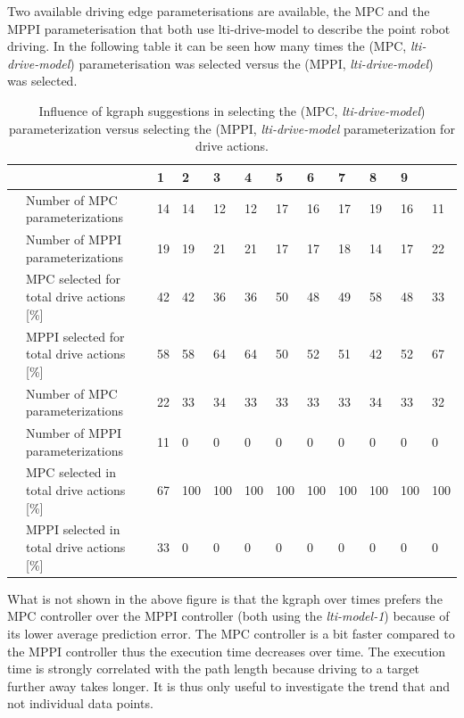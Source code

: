 Two available driving edge parameterisations are available, the \ac{MPC} and the \ac{MPPI} parameterisation that both use lti-drive-model to describe the point robot driving. In the following table it can be seen how many times the (\ac{MPC}, \textit{lti-drive-model}) parameterisation was selected versus the (\ac{MPPI}, \textit{lti-drive-model}) was selected.\bs

\begin{table}[H]
    \centering
    \begin{tabular}%
      {%
        >{\raggedright\arraybackslash}p{}
        >{\raggedright\arraybackslash}p{}
      |p{0.4cm}p{0.4cm}p{0.4cm}p{0.4cm}p{0.4cm}p{0.4cm}p{0.4cm}p{0.4cm}p{0.4cm}p{0.4cm}}
      \multicolumn{2}{c|}{Number of Tasks in experience} &0&1&2&3&4&5&6&7&8&9\\\toprule
      \multirow{4}{0.1\textwidth}{Without \ac{kgraph} suggestions} 
      &Number of \ac{MPC} parameterizations &14&14&12&12&17&16&17&19&16&11\\
      &Number of \ac{MPPI} parameterizations &19&19&21&21&17&17&18&14&17&22\\
      & \ac{MPC} selected for total drive actions [\%] &42&42&36&36&50&48&49&58&48&33\\
      & \ac{MPPI} selected for total drive actions [\%]&58&58&64&64&50&52&51&42&52&67\\\midrule
      \multirow{4}{0.1\textwidth}{With \ac{kgraph} suggestions} 
      &Number of \ac{MPC} parameterizations&22&33&34&33&33&33&33&34&33&32\\
      &Number of \ac{MPPI} parameterizations&11&0&0&0&0&0&0&0&0&0\\
      & \ac{MPC} selected in total drive actions [\%]&67&100&100&100&100&100&100&100&100&100\\
      & \ac{MPPI} selected in total drive actions [\%]&33&0&0&0&0&0&0&0&0&0\\
    \end{tabular}
    \caption{Influence of \ac{kgraph} suggestions in selecting the (\ac{MPC}, \textit{lti-drive-model}) parameterization versus selecting the (\ac{MPPI}, \textit{lti-drive-model} parameterization for drive actions.}%
    \label{table:rand_drive_mpc_vs_mppi}
\end{table}


What is not shown in the above figure is that the \ac{kgraph} over times prefers the \ac{MPC} controller over the \ac{MPPI} controller (both using the \textit{lti-model-1}) because of its lower average prediction error. The \ac{MPC} controller is a bit faster compared to the \ac{MPPI} controller thus the execution time decreases over time. The execution time is strongly correlated with the path length because driving to a target further away takes longer. It is thus only useful to investigate the trend that  and not individual data points.\bs

